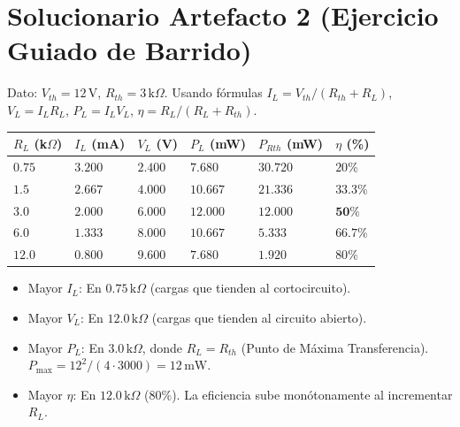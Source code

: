 \documentclass[11pt, a4paper]{article}
\begin{document}
\begin{tcolorbox}[colback=ucbblue!5!white, colframe=ucbblue, title=\textbf{Clave de Evaluación Docente: Experiencia Integrada A y Cargas}]
\end{tcolorbox}

\section*{Solucionario Artefacto 2 (Ejercicio Guiado de Barrido)}
Dato: $V_{th} = 12\,\text{V}$, $R_{th} = 3\,\text{k}\Omega$. Usando fórmulas $I_L = V_{th}/(R_{th}+R_L)$, $V_L = I_L R_L$, $P_L = I_L V_L$, $\eta = R_L / (R_L + R_{th})$.

\vspace{0.2cm}
\noindent\renewcommand{\arraystretch}{1.3}
\begin{tabularx}{\textwidth}{|>{\centering\arraybackslash}p{2cm}|X|X|X|X|X|}
\hline
\rowcolor{gray!10}
\textbf{$R_L$ (k$\Omega$)} & \textbf{$I_L$ (mA)} & \textbf{$V_L$ (V)} & \textbf{$P_L$ (mW)} & \textbf{$P_{Rth}$ (mW)} & \textbf{$\eta$ (\%)} \\
\hline
$0.75$ & $3.200$ & $2.400$ & $7.680$ & $30.720$ & $20\%$ \\
\hline
$1.5$  & $2.667$ & $4.000$ & $10.667$ & $21.336$ & $33.3\%$ \\
\hline
$\mathbf{3.0}$ & $\mathbf{2.000}$ & $\mathbf{6.000}$ & $\mathbf{12.000}$ & $\mathbf{12.000}$ & $\mathbf{50\%}$ \\
\hline
$6.0$  & $1.333$ & $8.000$ & $10.667$ & $5.333$ & $66.7\%$ \\
\hline
$12.0$ & $0.800$ & $9.600$ & $7.680$ & $1.920$ & $80\%$ \\
\hline
\end{tabularx}
\vspace{0.2cm}
\begin{itemize}\setlength\itemsep{-0.1em}
    \item Mayor $I_L$: En $0.75\,\text{k}\Omega$ (cargas que tienden al cortocircuito).
    \item Mayor $V_L$: En $12.0\,\text{k}\Omega$ (cargas que tienden al circuito abierto).
    \item Mayor $P_L$: En $3.0\,\text{k}\Omega$, donde $R_L = R_{th}$ (Punto de Máxima Transferencia). $P_{\text{max}} = 12^2/(4\cdot3000) = 12\,\text{mW}$.
    \item Mayor $\eta$: En $12.0\,\text{k}\Omega$ ($80\%$). La eficiencia sube monótonamente al incrementar $R_L$.
\end{itemize}
\end{document}
